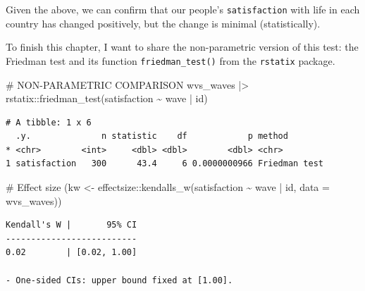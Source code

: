 \documentclass[
  letterpaper,
]{krantz}
\makeatletter
\newenvironment{Shaded}{\begin{snugshade}}{\end{snugshade}}
\newcommand{\AttributeTok}[1]{\textcolor[rgb]{0.40,0.45,0.13}{#1}}
\newcommand{\CommentTok}[1]{\textcolor[rgb]{0.37,0.37,0.37}{#1}}
\newcommand{\FunctionTok}[1]{\textcolor[rgb]{0.28,0.35,0.67}{#1}}
\newcommand{\NormalTok}[1]{\textcolor[rgb]{0.00,0.23,0.31}{#1}}
\newcommand{\OtherTok}[1]{\textcolor[rgb]{0.00,0.23,0.31}{#1}}
\newcommand{\SpecialCharTok}[1]{\textcolor[rgb]{0.37,0.37,0.37}{#1}}
\newenvironment{kframe}{%
\medskip{}
\setlength{\fboxsep}{.8em}
 \def\at@end@of@kframe{}%
 \ifinner\ifhmode%
  \def\at@end@of@kframe{\end{minipage}}%
  \begin{minipage}{\columnwidth}%
 \fi\fi%
 \def\FrameCommand##1{\hskip\@totalleftmargin \hskip-\fboxsep
 \colorbox{shadecolor}{##1}\hskip-\fboxsep
     \hskip-\linewidth \hskip-\@totalleftmargin \hskip\columnwidth}%
 \MakeFramed {\advance\hsize-\width
   \@totalleftmargin\z@ \linewidth\hsize
   \@setminipage}}%
 {\par\unskip\endMakeFramed%
 \at@end@of@kframe}
\renewenvironment{Shaded}{\begin{kframe}}{\end{kframe}}
\makeatother
\begin{document}
Given the above, we can confirm that our people's \texttt{satisfaction}
with life in each country has changed positively, but the change is
minimal (statistically).

To finish this chapter, I want to share the non-parametric version of
this test: the Friedman test and its function \texttt{friedman\_test()}
from the \texttt{rstatix} package.

\begin{Shaded}
\begin{Highlighting}[]
\CommentTok{\# NON{-}PARAMETRIC COMPARISON}
\NormalTok{wvs\_waves }\SpecialCharTok{|\textgreater{}}\NormalTok{ rstatix}\SpecialCharTok{::}\FunctionTok{friedman\_test}\NormalTok{(satisfaction }\SpecialCharTok{\textasciitilde{}}\NormalTok{ wave }\SpecialCharTok{|}\NormalTok{ id)}
\end{Highlighting}
\end{Shaded}

\begin{verbatim}
# A tibble: 1 x 6
  .y.              n statistic    df            p method       
* <chr>        <int>     <dbl> <dbl>        <dbl> <chr>        
1 satisfaction   300      43.4     6 0.0000000966 Friedman test
\end{verbatim}

\begin{Shaded}
\begin{Highlighting}[]
\CommentTok{\# Effect size}
\NormalTok{(kw }\OtherTok{\textless{}{-}}\NormalTok{ effectsize}\SpecialCharTok{::}\FunctionTok{kendalls\_w}\NormalTok{(satisfaction }\SpecialCharTok{\textasciitilde{}}\NormalTok{ wave }\SpecialCharTok{|}\NormalTok{ id,}
                       \AttributeTok{data =}\NormalTok{ wvs\_waves))}
\end{Highlighting}
\end{Shaded}

\begin{verbatim}
Kendall's W |       95% CI
--------------------------
0.02        | [0.02, 1.00]

- One-sided CIs: upper bound fixed at [1.00].
\end{verbatim}

\begin{Shaded}
\end{Shaded}
\end{document}
